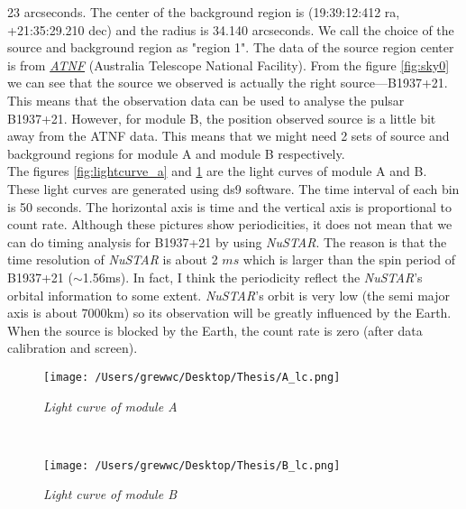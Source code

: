 \documentclass[12pt]{report}
\newcommand{\mycaption}[1]{\caption{\textit{\footnotesize #1}}}
\begin{document}
        23 arcseconds. The center of the background region is (19:39:12:412 ra, +21:35:29.210 dec) and the radius is 
        34.140 arcseconds. We call the choice of the source and background region as "region 1".
        The data of the source region center is from
        \href{http://www.atnf.csiro.au/people/pulsar/psrcat/proc\_form.php?version=1.56&startUserDefined=true&c1\_val%
        =&c2\_val=&c3\_val=&c4\_val=&sort\_attr=jname&sort\_order=asc&condition=&pulsar\_names=b1937\%2B21\%0D\%0A&ep%
        hemeris=short&submit\_ephemeris=Get+Ephemeris&coords\_unit=raj\%2Fdecj&radius=&coords\_1=&coords\_2=&style=%
        Long+with+last+digit+error&no\_value=*&fsize=3&x\_axis=&x\_scale=linear&y\_axis=&y\_scale=linear&state=query}%
        {\textit{ATNF}}
        (Australia Telescope National Facility). From the figure \ref{fig:sky0} we can see that the source we 
        observed is actually the right source---B1937+21. This means that the observation data can be used to analyse 
        the pulsar B1937+21. However, for module B, the position observed source is a little bit away from the 
        ATNF data. This means that we might need 2 sets of source and background regions for module A and module B
        respectively.\\
        \indent  
        The figures \ref{fig:lightcurve_a} and \ref{fig:lightcurve_b} are the light curves of module A and B.
        These light curves are generated using ds9 software. The time interval of each bin is 50 seconds.
        The horizontal axis is time and the vertical axis is proportional to count rate. 
        Although these pictures show  periodicities, it does not mean that we can do timing analysis for B1937+21 
        by using \textit{NuSTAR}. The reason is that the time resolution of \textit{NuSTAR} is about 2 $ms$ which
        is larger than the spin period of B1937+21 ($\sim$1.56ms). In fact, I think the periodicity reflect the 
        \textit{NuSTAR}'s orbital information to some extent. \textit{NuSTAR}'s orbit is very low (the semi major
        axis is about 7000km) so its observation will be greatly influenced by the Earth. When the source is blocked
        by the Earth, the count rate is zero (after data calibration and screen).\\
        \begin{figure}[h]
          \begin{minipage}{1\textwidth}
            \begin{center}
                \texttt{[image: /Users/grewwc/Desktop/Thesis/A\_lc.png]}
                \mycaption{Light curve of module A}
                \label{fig:lightcurve_a}
              \end{center}
            \end{minipage}
         \\ 
          \begin{minipage}{\textwidth}
            \centering
            \texttt{[image: /Users/grewwc/Desktop/Thesis/B\_lc.png]}
          \mycaption{Light curve of module B}
          \label{fig:lightcurve_b}
          \end{minipage}
        \end{figure}\\
\end{document}
